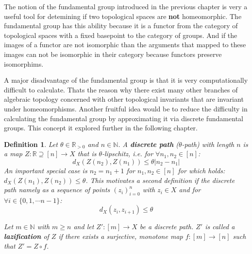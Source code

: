 \documentclass[a4paper, 11pt, twoside]{article}
\newcommand{\R}[0]{\mathbb{R}}
\newcommand{\N}[0]{\mathbb{N}}
\theoremstyle{break}
\theoremstyle{break}
\newtheorem{defin}[thm]{Definition}
\begin{document}
The notion of the fundamental group introduced in the previous chapter is very a useful tool for detemining if two topological spaces are \textbf{not} homeomorphic.
The fundamental group has this ability because it is a functor from the category of topological spaces with a fixed basepoint to the category of groups. 
And if the images of a functor are not isomorphic than the arguments that mapped to these images can not be isomorphic in their category because functors preserve isomorphims.

A major disadvantage of the fundamental group is that it is very computationally difficult to calculate.
Thats the reason why there exist many other branches of algebraic topology concerned with other topological invariants that are invariant under homeomorphisms. 
Another fruitful idea would be to reduce the difficulty in calculating the fundamental group by approximating it via discrete fundamental groups. 
This concept it explored further in the following chapter.

\begin{defin} \label{def:discrete-path}
  Let $\theta \in \R_{>0}$ and $n \in \N$. A \textbf{discrete path} ($\theta$-path) with length $n$ is a map $Z: \R \supseteq [n] \to X$ that is $\theta$-lipschitz, i.e. for $\forall n_1, n_2 \in [n]$:
  \begin{equation}
    d_X(Z(n_2), Z(n_1)) \leq \theta |n_2 - n_1|
  \end{equation}
  An important special case is $n_2 = n_1 + 1$ for $n_1, n_2 \in [n]$ for which holds: $d_X(Z(n_1), Z(n_2)) \leq \theta$. This motivates a second
  definition if the discrete path namely as a sequence of points $(z_i)_{i=0}^n$ with $z_i \in X$ and for $\forall i \in \{0, 1, \cdots n-1\}$:
  \begin{equation}
    d_X(z_i, z_{i+1}) \leq \theta
  \end{equation}

  Let $m \in \N$ with $m \geq n$ and let $Z': [m] \to X$ be a discrete path. $Z'$ is called a \textbf{lazification} of $Z$ if there exists a surjective, monotone map 
  $f: [m] \to [n]$ such that $Z' = Z \circ f$.
\end{defin}
\end{document}
